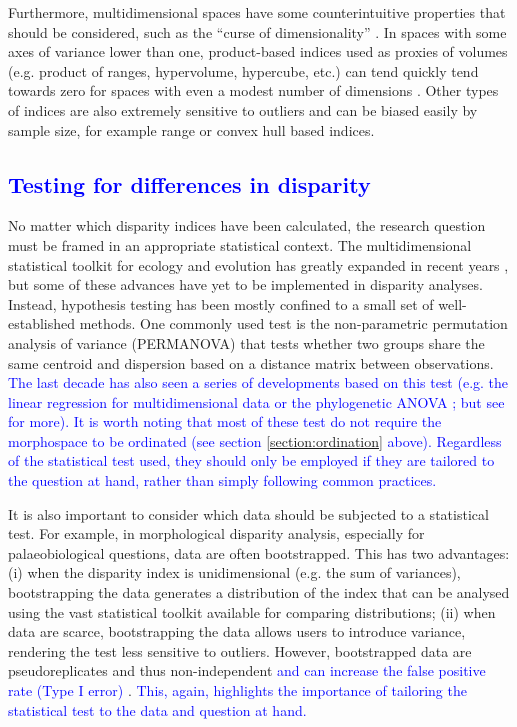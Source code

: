 \documentclass[12pt,letterpaper]{article}
\begin{document}
Furthermore, multidimensional spaces have some counterintuitive properties that should be considered, such as the ``curse of dimensionality'' \citep{Bellman1966}.
In spaces with some axes of variance lower than one, product-based indices used as proxies of volumes (e.g. product of ranges, hypervolume, hypercube, etc.) can tend quickly tend towards zero for spaces with even a modest number of dimensions \citep{Bellman1966}.
Other types of indices are also extremely sensitive to outliers and can be biased easily by sample size, for example range \citep{Wills2001} or convex hull based \citep{Jackson2011} indices.

\textcolor{blue}{\subsection{Testing for differences in disparity} \label{section:testing}}

No matter which disparity indices have been calculated, the research question must be framed in an appropriate statistical context.
The multidimensional statistical toolkit for ecology and evolution has greatly expanded in recent years \citep{clavel2015mvmorph, Adams2018}, but some of these advances have yet to be implemented in disparity analyses.
Instead, hypothesis testing has been mostly confined to a small set of well-established methods.
One commonly used test is the non-parametric permutation analysis of variance (PERMANOVA) \citep{Anderson2001} that tests whether two groups share the same centroid and dispersion based on a distance matrix between observations.
\textcolor{blue}{The last decade has also seen a series of developments based on this test (e.g. the linear regression for multidimensional data \citealt{collyer2015method} or the phylogenetic ANOVA \citealt{Adams2014}; but see \citealt{Adams2018,lloyd2016} for more).
It is worth noting that most of these test do not require the morphospace to be ordinated (see section \ref{section:ordination} above).
Regardless of the statistical test used, they should only be employed if they are tailored to the question at hand, rather than simply following common practices.}

It is also important to consider which data should be subjected to a statistical test.
For example, in morphological disparity analysis, especially for palaeobiological questions, data are often bootstrapped.
This has two advantages: (i) when the disparity index is unidimensional (e.g. the sum of variances), bootstrapping the data generates a distribution of the index that can be analysed using the vast statistical toolkit available for comparing distributions; (ii) when data are scarce, bootstrapping the data allows users to introduce variance, rendering the test less sensitive to outliers.
However, bootstrapped data are pseudoreplicates and thus non-independent \textcolor{blue}{and can increase the false positive rate (Type I error)} \citep{strube1988bootstrap}.
\textcolor{blue}{This, again, highlights the importance of tailoring the statistical test to the data and question at hand.}
\end{document}
